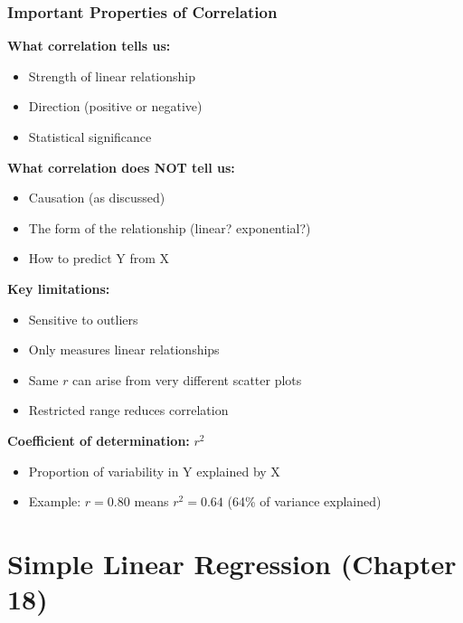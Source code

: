 \documentclass{beamer}
\begin{document}
\begin{frame}
\frametitle{Important Properties of Correlation}
\textbf{What correlation tells us:}
\begin{itemize}
\item Strength of linear relationship
\item Direction (positive or negative)
\item Statistical significance
\end{itemize}

\vspace{0.3cm}
\textbf{What correlation does NOT tell us:}
\begin{itemize}
\item Causation (as discussed)
\item The form of the relationship (linear? exponential?)
\item How to predict Y from X
\end{itemize}

\vspace{0.5cm}
\textbf{Key limitations:}
\begin{itemize}
\item Sensitive to outliers
\item Only measures linear relationships
\item Same $r$ can arise from very different scatter plots
\item Restricted range reduces correlation
\end{itemize}

\vspace{0.3cm}
\textbf{Coefficient of determination:} $r^2$
\begin{itemize}
\item Proportion of variability in Y explained by X
\item Example: $r = 0.80$ means $r^2 = 0.64$ (64\% of variance explained)
\end{itemize}
\end{frame}

\section{Simple Linear Regression (Chapter 18)}
\end{document}
